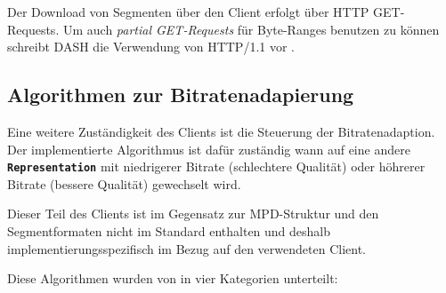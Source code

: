 \documentclass[paper = a4, fontsize = 12pt, parskip = half]{scrartcl} %
\def\elem#1{\texttt{\textbf{#1}}}
\begin{document}
Der Download von Segmenten über den Client erfolgt über HTTP GET-Requests. Um auch \textit{partial GET-Requests} für Byte-Ranges benutzen zu können schreibt DASH die Verwendung von HTTP/1.1 vor \cite{international_organization_for_standardization_isoiec_nodate}.

\subsection{Algorithmen zur Bitratenadapierung}
Eine weitere Zuständigkeit des Clients ist die Steuerung der Bitratenadaption. Der implementierte Algorithmus ist dafür zuständig wann auf eine andere \elem{Representation} mit niedrigerer Bitrate (schlechtere Qualität) oder höhrerer Bitrate (bessere Qualität) gewechselt wird.

Dieser Teil des Clients ist im Gegensatz zur MPD-Struktur und den Segmentformaten nicht im Standard enthalten und deshalb implementierungsspezifisch im Bezug auf den verwendeten Client.

Diese Algorithmen wurden von \cite{bentaleb_survey_2019} in vier Kategorien unterteilt:
\end{document}
